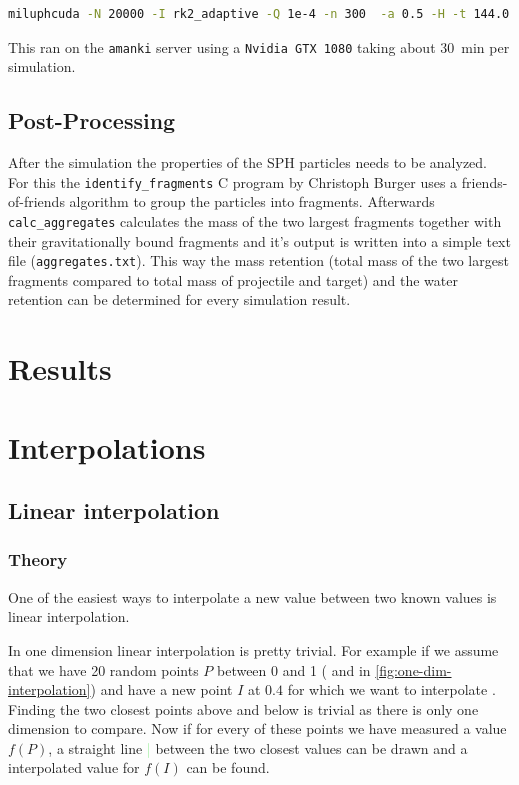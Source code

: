 
\begin{lstlisting}[language=bash]
miluphcuda -N 20000 -I rk2_adaptive -Q 1e-4 -n 300  -a 0.5 -H -t 144.0 -f impact.0000 -m material.cfg -s -g
\end{lstlisting}

This ran on the \texttt{amanki} server using a \texttt{Nvidia GTX 1080} taking about \SI{30}{\minute} per simulation. 


\section{Post-Processing}

After the simulation the properties of the SPH particles needs to be analyzed. For this the \texttt{identify\_fragments} C program by Christoph Burger uses a friends-of-friends algorithm to group the particles into fragments. Afterwards \texttt{calc\_aggregates} calculates the mass of the two largest fragments together with their gravitationally bound fragments and it's output is written into a simple text file (\texttt{aggregates.txt}). This way the mass retention (total mass of the two largest fragments compared to total mass of projectile and target) and the water retention can be determined for every simulation result.


\chapter{Results}

\chapter{Interpolations}

\section{Linear interpolation}

\subsection{Theory}

One of the easiest ways to interpolate a new value between two known values is linear interpolation. 

In one dimension linear interpolation is pretty trivial. For example if we assume that we have 20 random points $P$ between 0 and 1 (\textcolor{Red}{\textbullet} and  \textcolor{Blue}{\textbullet} in \ref{fig:one-dim-interpolation}) and have a new point $I$ \textcolor{Green}{\textbullet} at $0.4$ for which we want to interpolate . Finding the two closest points \textcolor{Red}{\textbullet} above and below is trivial as there is only one dimension to compare. Now if for every of these points we have measured a value $f(P)$, a straight line  \textcolor{LightGreen}{|} between the two closest values can be drawn and a interpolated value for $f(I)$ can be found.


